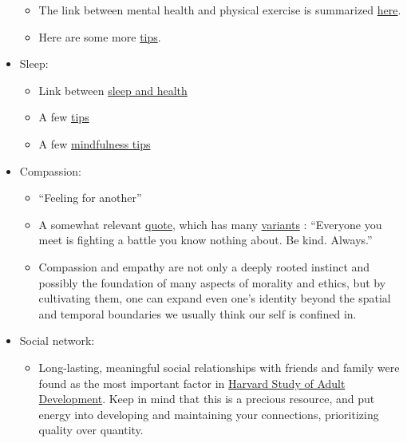 \documentclass{article}
\begin{document}
\begin{itemize}
\begin{itemize}
        \item The link between mental health and physical exercise is summarized \href{https://www.mentalhealth.org.uk/publications/how-to-using-exercise}{here}.
        \item Here are some more \href{https://www.mayoclinic.org/diseases-conditions/depression/in-depth/depression-and-exercise/art-20046495}{tips}.
    \end{itemize}
    \item Sleep:
    \begin{itemize}
        \item Link between \href{https://www.healthline.com/nutrition/10-reasons-why-good-sleep-is-important#10.-Sleep-affects-emotions-and-social-interactions}{sleep and health}
        \item A few \href{https://www.healthline.com/nutrition/ways-to-fall-asleep#_noHeaderPrefixedContent}{tips}
        \item A few \href{https://mindfulnessexercises.com/sleep-meditation-scripts/}{mindfulness tips}
    \end{itemize}
    \item Compassion:
    \begin{itemize}
        \item ``Feeling for another''
        \item A somewhat relevant \href{https://www.goodreads.com/quotes/6697537-everyone-you-meet-is-fighting-a-battle-you-know-nothing}{quote}, which has many \href{https://quoteinvestigator.com/2010/06/29/be-kind/#more-778}{variants} : ``Everyone you meet is fighting a battle you know nothing about. Be kind. Always.''
        \item Compassion and empathy are not only a deeply rooted instinct and possibly the foundation of many aspects of morality and ethics, but by cultivating them, one can expand even one's identity beyond the spatial and temporal boundaries we usually think our self is confined in.
    \end{itemize}
    \item Social network:
    \begin{itemize}
    \item Long-lasting, meaningful social relationships with friends and family were found as the most important factor in \href{https://news.harvard.edu/gazette/story/2017/04/over-nearly-80-years-harvard-study-has-been-showing-how-to-live-a-healthy-and-happy-life/}{Harvard Study of Adult Development}.
    Keep in mind that this is a precious resource, and put energy into developing and maintaining your connections, prioritizing quality over quantity.

\end{itemize}
\end{itemize}
\end{document}
